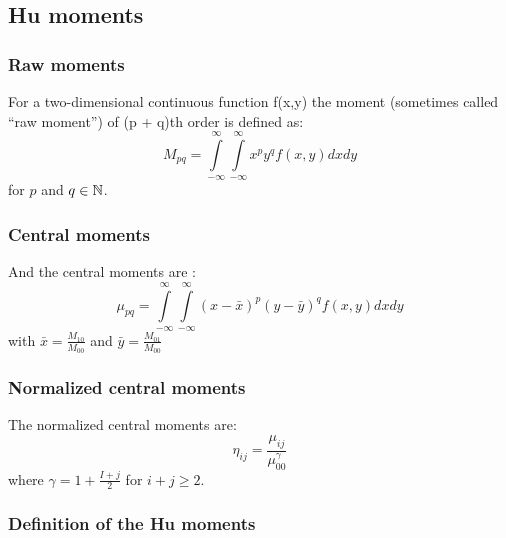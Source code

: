 \subsection{Hu moments}

\subsubsection{Raw moments}

For a two-dimensional continuous function f(x,y) the moment (sometimes called \enquote{raw moment}) of (p + q)th order is defined as: 
$$ M_{pq}=\int \limits _{-\infty }^{\infty }\int \limits _{-\infty }^{\infty }x^{p}y^{q}f(x,y) dx dy $$
for $p$ and $q \in \mathbb{N} $.

\subsubsection{Central moments}

And the central moments are :
$$\mu_{pq}=\int \limits_{-\infty }^{\infty }\int \limits _{-\infty}^{\infty} (x- \bar{x})^{p}(y - \bar{y})^{q} f(x,y) dx dy $$
with $\bar{x}=\frac{M_{10}}{M_{00}}$ and $\bar{y}=\frac{M_{01}}{M_{00}}$

\subsubsection{Normalized central moments}

The normalized central moments are:
$$ \eta_{ij}=\frac{\mu _{ij}}{\mu_{00}^{\gamma}} $$
where $\gamma = 1 + \frac{I + j}{2}$ for $i + j \geq 2$.

\subsubsection{Definition of the Hu moments}

